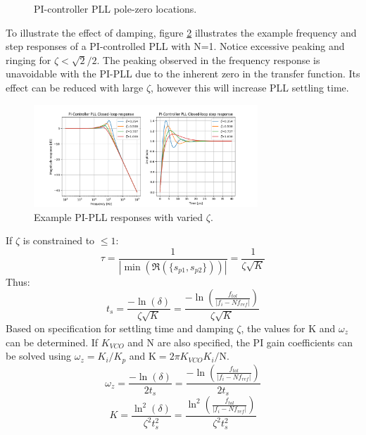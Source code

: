 \begin{figure}[htb!]
	\center
	\caption{PI-controller PLL pole-zero locations.}
	\label{fig:pi_pll_pz}
\end{figure}
\FloatBarrier
To illustrate the effect of damping, figure \ref{fig:pi_pll_response} illustrates the example frequency and step responses of a PI-controlled PLL with N=1. Notice excessive peaking and ringing for $\zeta<\sqrt{2}/2$. The peaking observed in the frequency response is unavoidable with the PI-PLL due to the inherent zero in the transfer function. Its effect can be reduced with large $\zeta$, however this will increase PLL settling time. 
\begin{figure}[htb!]
	\center\includegraphics[width=0.75\textwidth, angle=0]{figs/pi_pll_response.png}
	\caption{Example PI-PLL responses with varied $\zeta$.}
	\label{fig:pi_pll_response}
\end{figure}
\FloatBarrier
If $\zeta$ is constrained to $\leq 1$:
\begin{equation}
\tau = \frac{1}{|\min(\Re(\{s_{p1}, s_{p2}\}))|} = \frac{1}{\zeta\sqrt{K}}
\end{equation}
Thus:
\begin{equation}
t_s = \frac{-\ln(\delta)}{\zeta\sqrt{K}} = \frac{-\ln\left(\frac{f_{tol}}{|f_i - Nf_{ref}|}\right)}{\zeta\sqrt{K}} 
\end{equation}
Based on specification for settling time and damping $\zeta$, the values for K and $\omega_z$ can be determined. If $K_{VCO}$ and $\mathrm{N}$ are also specified, the PI gain coefficients can be solved using $\omega_z = K_i/K_p$ and $\mathrm{K} = 2\pi K_{VCO}K_i/\mathrm{N}$.
\begin{equation}
\omega_z = \frac{-\ln(\delta)}{2t_s} =  \frac{-\ln\left(\frac{f_{tol}}{|f_i - Nf_{ref}|}\right)}{2t_s}
\end{equation}
\begin{equation}
K = \frac{\ln^2(\delta)}{\zeta^2t_s^2} =  \frac{\ln^2\left(\frac{f_{tol}}{|f_i - Nf_{ref}|}\right)}{\zeta^2t_s^2}
\end{equation}

